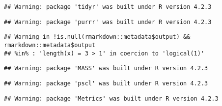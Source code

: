 \documentclass[
]{article}
\begin{document}
\begin{verbatim}
## Warning: package 'tidyr' was built under R version 4.2.3
\end{verbatim}

\begin{verbatim}
## Warning: package 'purrr' was built under R version 4.2.3
\end{verbatim}

\begin{verbatim}
## Warning in !is.null(rmarkdown::metadata$output) && rmarkdown::metadata$output
## %in% : 'length(x) = 3 > 1' in coercion to 'logical(1)'
\end{verbatim}

\begin{verbatim}
## Warning: package 'MASS' was built under R version 4.2.3
\end{verbatim}

\begin{verbatim}
## Warning: package 'pscl' was built under R version 4.2.3
\end{verbatim}

\begin{verbatim}
## Warning: package 'Metrics' was built under R version 4.2.3
\end{verbatim}
\end{document}

